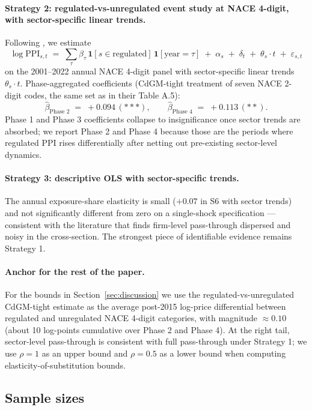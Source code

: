 \paragraph{Strategy 2: regulated-vs-unregulated event study at NACE 4-digit, with sector-specific linear trends.} Following \citet{colmeretal2023}, we estimate
\[
    \log \text{PPI}_{s,t} \;=\; \sum_\tau \beta_\tau\,\mathbf{1}[s \in \text{regulated}]\,\mathbf{1}[\text{year} = \tau] \;+\; \alpha_s \;+\; \delta_t \;+\; \theta_s \cdot t \;+\; \varepsilon_{s,t}
\]
on the 2001--2022 annual NACE 4-digit panel with sector-specific linear trends $\theta_s \cdot t$. Phase-aggregated coefficients (CdGM-tight treatment of seven NACE 2-digit codes, the same set as in their Table A.5):
\[
    \widehat{\beta}_{\text{Phase 2}} \;=\; +0.094\,(***), \qquad \widehat{\beta}_{\text{Phase 4}} \;=\; +0.113\,(**).
\]
Phase 1 and Phase 3 coefficients collapse to insignificance once sector trends are absorbed; we report Phase 2 and Phase 4 because those are the periods where regulated PPI rises differentially after netting out pre-existing sector-level dynamics.

\paragraph{Strategy 3: descriptive OLS with sector-specific trends.} The annual exposure-share elasticity is small ($+0.07$ in S6 with sector trends) and not significantly different from zero on a single-shock specification --- consistent with the literature \citep[e.g.,][]{martin2014} that finds firm-level pass-through dispersed and noisy in the cross-section. The strongest piece of identifiable evidence remains Strategy 1.

\paragraph{Anchor for the rest of the paper.} For the bounds in Section~\ref{sec:discussion} we use the regulated-vs-unregulated CdGM-tight estimate as the average post-2015 log-price differential between regulated and unregulated NACE 4-digit categories, with magnitude $\approx 0.10$ (\ie about 10 log-points cumulative over Phase 2 and Phase 4). At the right tail, sector-level pass-through is consistent with full pass-through under Strategy 1; we use $\rho = 1$ as an upper bound and $\rho = 0.5$ as a lower bound when computing elasticity-of-substitution bounds.

\subsection{Sample sizes}

